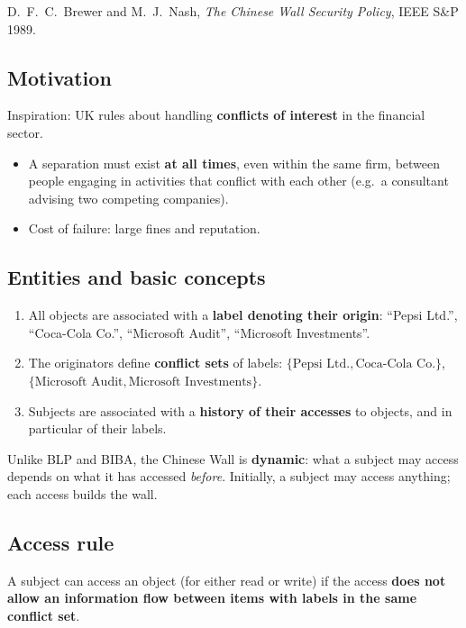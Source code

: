 D.\ F.\ C.\ Brewer and M.\ J.\ Nash, \emph{The Chinese Wall Security Policy}, IEEE S\&P 1989.

\subsection{Motivation}

Inspiration: UK rules about handling \textbf{conflicts of interest} in the financial sector.
\begin{itemize}
    \item A separation must exist \textbf{at all times}, even within the same firm, between people engaging in activities that conflict with each other (e.g.\ a consultant advising two competing companies).
    \item Cost of failure: large fines and reputation.
\end{itemize}

\subsection{Entities and basic concepts}

\begin{enumerate}
    \item All objects are associated with a \textbf{label denoting their origin}: ``Pepsi Ltd.'', ``Coca-Cola Co.'', ``Microsoft Audit'', ``Microsoft Investments''.
    \item The originators define \textbf{conflict sets} of labels: $\{\text{Pepsi Ltd.}, \text{Coca-Cola Co.}\}$, \\$\{\text{Microsoft Audit}, \text{Microsoft Investments}\}$.
    \item Subjects are associated with a \textbf{history of their accesses} to objects, and in particular of their labels.
\end{enumerate}

\begin{remark}
Unlike BLP and BIBA, the Chinese Wall is \textbf{dynamic}: what a subject may access depends on what it has accessed \emph{before}. Initially, a subject may access anything; each access builds the wall.
\end{remark}

\subsection{Access rule}

\begin{definition}
A subject can access an object (for either read or write) if the access \textbf{does not allow an information flow between items with labels in the same conflict set}.
\end{definition}

